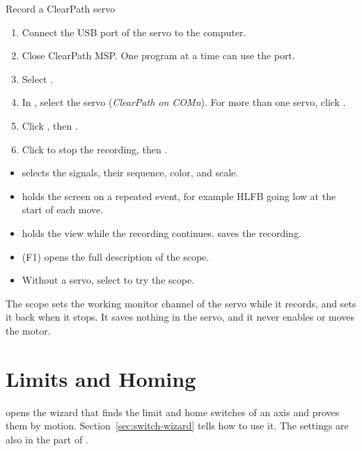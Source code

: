 \begin{procedure}{Record a ClearPath servo}
\begin{enumerate}
  \item Connect the USB port of the servo to the computer.
  \item Close ClearPath MSP. One program at a time can use the port.
  \item Select .
  \item In , select the servo (\emph{ClearPath on COMn}). For more
        than one servo, click .
  \item Click , then .
  \item Click  to stop the recording, then .
\end{enumerate}
\end{procedure}

\begin{itemize}
  \item {} selects the signals, their sequence, color, and scale.
  \item {} holds the screen on a repeated event, for example
        HLFB going low at the start of each move.
  \item {} holds the view while the recording continues.
         saves the recording.
  \item {} (F1) opens the full description of the scope.
  \item Without a servo, select  to try the scope.
\end{itemize}

\begin{note}
\notelabel The scope sets the working monitor channel of the servo while it
records, and sets it back when it stops. It saves nothing in the servo, and
it never enables or moves the motor.
\end{note}

\section{Limits and Homing}

 opens the wizard that finds
the limit and home switches of an axis and proves them by motion.
Section~\ref{sec:switch-wizard} tells how to use it. The settings are also in
the  part of .


